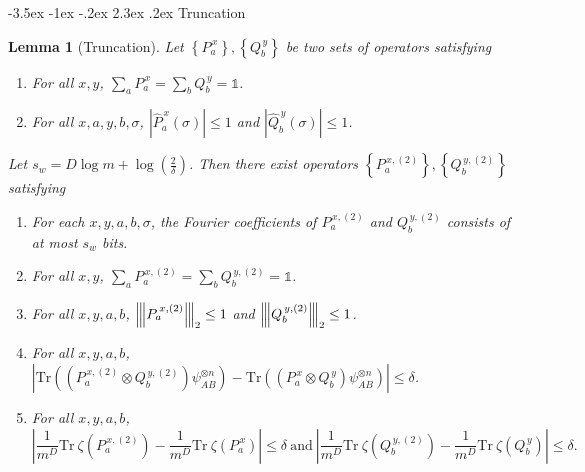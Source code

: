 \documentclass[11pt]{article}
\makeatletter
\renewcommand{\section}{\@startsection {section}{1}{\z@}%
             {-3.5ex \@plus -1ex \@minus -.2ex}%
             {2.3ex \@plus .2ex}%
             {\normalfont\Large\scshape\bfseries}}
\theoremstyle{plain}
\newtheorem{lemma}[theorem]{Lemma}
\theoremstyle{definition}
\newcommand {\set} [1] {\ensuremath{ \left\lbrace #1 \right\rbrace }}
\newcommand {\br} [1] {\ensuremath{ \left( #1 \right) }}
\newcommand {\ab} [1] {\ensuremath{ \left| #1 \right| }}
\newcommand{\nnorm}[1]{{\left\vert\kern-0.25ex\left\vert\kern-0.25ex\left\vert #1
		\right\vert\kern-0.25ex\right\vert\kern-0.25ex\right\vert}}
\newcommand {\Tr} {\ensuremath{ \mathrm{Tr} }}
\newcommand {\id} {\ensuremath{\mathds{1}}}
\newcommand{\dlbo} {\ensuremath{{D}}}
\newcommand{\wireal} {\ensuremath{{s_{w}}}}
\newcommand{\Pss} {\ensuremath{P^{\,x}_a}}
\newcommand{\Qss} {\ensuremath{Q^{\,y}_b}}
\newcommand{\Pnn}[1] {\ensuremath{{P^{\,x, (#1)}_a}}}
\newcommand{\Qnn}[1] {\ensuremath{{Q^{\,y, (#1)}_b}}}
\newcommand{\Pff} {\ensuremath{\widehat{P}^{\,x}_a(\sigma)}}
\newcommand{\Qff} {\ensuremath{\widehat{Q}^{\,y}_b(\sigma)}}
\newcommand{\1}{\mathbb{1}} %
\makeatother
\begin{document}
\section{Truncation}
\begin{lemma}[Truncation]\label{lem:truncating_low_degrees}
  Let $\set{\Pss}, \set{\Qss}$ be two sets of operators satisfying
  \begin{enumerate}
    \item For all $x, y$, $\sum_{a}\Pss=\sum_{b}\Qss=\id$.
    \item For all $x, a, y, b, \sigma$, $\ab{\Pff}\le1$ and $\ab{\Qff}\le 1$.
  \end{enumerate}
  Let $\wireal = D\log m + \log\br{\frac{2}{\delta}}$.
  Then there exist operators $\set{\Pnn{2}}, \set{\Qnn{2}}$ satisfying
  \begin{enumerate}
    \item For each $x, y, a, b, \sigma$, the Fourier coefficients of $\Pnn{2}$ and $\Qnn{2}$ consists of at most $\wireal$ bits.
    \item For all $x, y$, $\sum_{a}\Pnn{2}=\sum_{b}\Qnn{2}=\id$.
    \item For all $x, y, a, b$, $\nnorm{\Pnn{2}}_2\le1$ and $\nnorm{\Qnn{2}}_2\le1$.
    \item For all $x, y, a, b$, $\ab{\Tr\br{\br{\Pnn{2}\otimes \Qnn{2}}\psi^{\otimes n}_{AB}}-\Tr\br{\br{\Pss\otimes \Qss}\psi^{\otimes n}_{AB}}}\leq\delta$.
	\item For all $x, y, a, b$, \[\ab{\frac{1}{m^\dlbo}\Tr~\zeta\br{\Pnn{2}}-\frac{1}{m^\dlbo}\Tr~\zeta\br{\Pss}}\leq\delta~\mbox{and}~\ab{\frac{1}{m^\dlbo}\Tr~\zeta\br{\Qnn{2}}-\frac{1}{m^\dlbo}\Tr~\zeta\br{\Qss}}\leq\delta. \]
  \end{enumerate}
\end{lemma}
\end{document}
